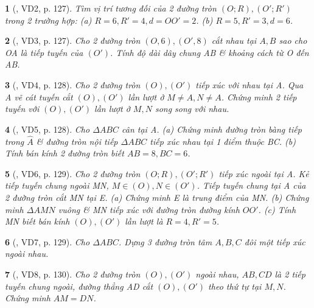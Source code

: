 \documentclass{article}
\newtheorem{baitoan}{}
\begin{document}
\begin{baitoan}[\cite{Binh_boi_duong_Toan_9_tap_1}, VD2, p. 127]
	Tìm vị trí tương đối của 2 đường tròn $(O;R),(O';R')$ trong 2 trường hợp: (a) $R = 6,R' = 4,d = OO' = 2$. (b) $R = 5,R' = 3,d = 6$.
\end{baitoan}

\begin{baitoan}[\cite{Binh_boi_duong_Toan_9_tap_1}, VD3, p. 127]
	Cho 2 đường tròn $(O,6),(O',8)$ cắt nhau tại $A,B$ sao cho OA là tiếp tuyến của $(O')$. Tính độ dài dây chung AB \& khoảng cách từ O đến AB.
\end{baitoan}

\begin{baitoan}[\cite{Binh_boi_duong_Toan_9_tap_1}, VD4, p. 128]
	 Cho 2 đường tròn $(O),(O')$ tiếp xúc với nhau tại A. Qua A vẽ cát tuyến cắt $(O),(O')$ lần lượt ở $M\ne A,N\ne A$. Chứng minh 2 tiếp tuyến với $(O),(O')$ lần lượt ở $M,N$ song song với nhau.
\end{baitoan}

\begin{baitoan}[\cite{Binh_boi_duong_Toan_9_tap_1}, VD5, p. 128]
	Cho $\Delta ABC$ cân tại A. (a) Chứng minh đường tròn bàng tiếp trong $\widehat{A}$ \& đường tròn nội tiếp $\Delta ABC$ tiếp xúc nhau tại 1 điểm thuộc BC. (b) Tính bán kính 2 đường tròn biết $AB = 8,BC = 6$.
\end{baitoan}

\begin{baitoan}[\cite{Binh_boi_duong_Toan_9_tap_1}, VD6, p. 129]
	Cho 2 đường tròn $(O;R),(O';R')$ tiếp xúc ngoài tại A. Kẻ tiếp tuyến chung ngoài MN, $M\in(O),N\in(O')$. Tiếp tuyến chung tại A của 2 đường tròn cắt MN tại E. (a) Chứng minh E là trung điểm của MN. (b) Chứng minh $\Delta AMN$ vuông \& MN tiếp xúc với đường tròn đường kính $OO'$. (c) Tính MN biết bán kính $(O),(O')$ lần lượt là $R = 4,R' = 5$.
\end{baitoan}

\begin{baitoan}[\cite{Binh_boi_duong_Toan_9_tap_1}, VD7, p. 129]
	Cho $\Delta ABC$. Dựng 3 đường tròn tâm $A,B,C$ đôi một tiếp xúc ngoài nhau.
\end{baitoan}

\begin{baitoan}[\cite{Binh_boi_duong_Toan_9_tap_1}, VD8, p. 130]
	Cho 2 đường tròn $(O),(O')$ ngoài nhau, $AB,CD$ là 2 tiếp tuyến chung ngoài, đường thẳng AD cắt $(O),(O')$ theo thứ tự tại $M,N$. Chứng minh $AM = DN$.
\end{baitoan}
\end{document}
